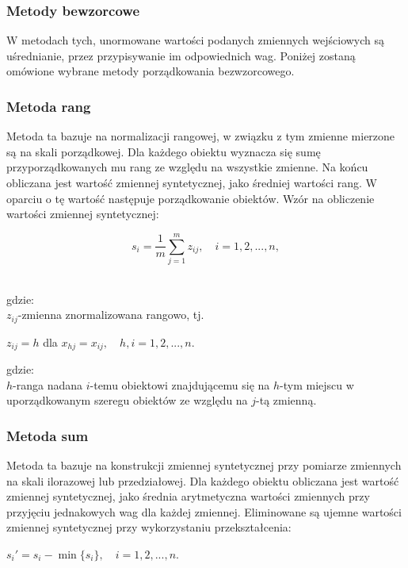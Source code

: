 \documentclass[12pt,a4paper]{report}
\begin{document}
\subsubsection{Metody bewzorcowe}
\noindent

W metodach tych, unormowane wartości podanych zmiennych wejściowych są uśrednianie, przez przypisywanie im odpowiednich wag. 
Poniżej zostaną omówione wybrane metody porządkowania bezwzorcowego.

\subsubsection{Metoda rang}
\noindent


Metoda ta bazuje na normalizacji rangowej, w związku z tym zmienne mierzone są na skali porządkowej. Dla każdego obiektu wyznacza się sumę przyporządkowanych mu rang ze względu na wszystkie zmienne. Na końcu obliczana jest wartość zmiennej syntetycznej, jako średniej wartości rang. W oparciu o tę wartość następuje porządkowanie obiektów. Wzór na obliczenie wartości zmiennej syntetycznej: 
\begin{center}
$$s_{i}=\frac{1}{m}\sum_{j=1}^{m} z_{ij},\quad i=1, 2, ..., n,$$\\
\end{center}
gdzie:\\
$z_{ij}$-zmienna znormalizowana rangowo, tj.
\begin{center}
$z_{ij}=h$ dla $x_{hj}=x_{ij}, \quad h,i=1, 2, ..., n.$
\end{center}
gdzie:\\
$h$-ranga nadana $i$-temu obiektowi znajdującemu się na $h$-tym miejscu w uporządkowanym szeregu obiektów ze względu na $j$-tą zmienną.


\subsubsection{Metoda sum}
\noindent


Metoda ta bazuje na konstrukcji zmiennej syntetycznej przy pomiarze zmiennych na skali ilorazowej lub przedziałowej. Dla każdego obiektu obliczana jest wartość zmiennej syntetycznej, jako średnia arytmetyczna wartości zmiennych przy przyjęciu jednakowych wag dla każdej zmiennej. Eliminowane są ujemne wartości zmiennej syntetycznej przy wykorzystaniu przekształcenia: 
\begin{center}
$s_{i}'=s_{i}-\min\{s_i\}, \quad i=1, 2, ..., n$.\\
\end{center}
\end{document}
